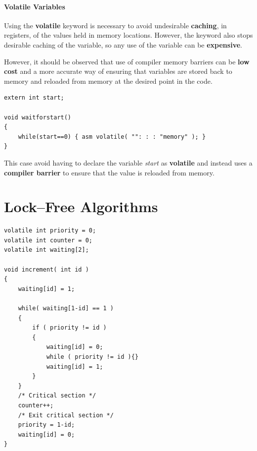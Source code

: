 \documentclass[12pt,a4paper]{report}
\begin{document}
\paragraph*{Volatile Variables}
Using the \textbf{volatile} keyword is necessary to avoid undesirable \textbf{caching}, in registers, of the values held in memory locations. However, the keyword also stops desirable caching of the variable, so any use of the variable can be \textbf{expensive}.
\par
However, it should be observed that use of compiler memory barriers can be \textbf{low cost} and a more accurate way of ensuring that variables are stored back to memory and reloaded from memory at the desired point in the code.
\begin{lstlisting}
extern int start;

void waitforstart()
{
	while(start==0) { asm volatile( "": : : "memory" ); }
}

\end{lstlisting}
This case avoid having to declare the variable \textit{start} as \textbf{volatile} and instead uses a \textbf{compiler barrier} to ensure that the value is reloaded from memory.
\section{Lock--Free Algorithms}
\begin{lstlisting}
volatile int priority = 0;
volatile int counter = 0;
volatile int waiting[2];

void increment( int id )
{
	waiting[id] = 1;

	while( waiting[1-id] == 1 )
	{
		if ( priority != id )
		{
			waiting[id] = 0;
			while ( priority != id ){}
			waiting[id] = 1;
		}
	}
	/* Critical section */
	counter++;
	/* Exit critical section */
	priority = 1-id;
	waiting[id] = 0;
}
\end{lstlisting}
\end{document}
